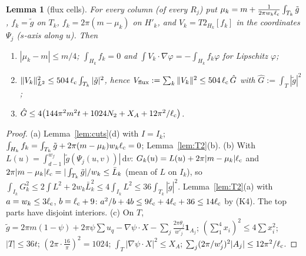 \documentclass[11pt]{article}
\newtheorem{lemma}[theorem]{Lemma}
\theoremstyle{definition}
\theoremstyle{remark}
\newcommand{\dd}{\,\mathrm d}
\newcommand{\lc}{\ell_{\rm c}}
\begin{document}
\begin{lemma}[flux cells]\label{lem:flux}
For every column (of every $R_j$) put $\mu_k=m+\frac1{2\pi w_k\lc}\int_{T_k}\tilde g$, $f_k=\tilde g$ on $T_k$, $f_k=2\pi(m-\mu_k)$ on $H'_k$, and
$V_k=T2_{H_k}[f_k]$ in the coordinates $\Psi_j$ ($s$-axis along $u$). Then
\begin{enumerate}[label=(\alph*)]
\item $|\mu_k-m|\le m/4$; $\int_{H_k}f_k=0$ and $\int V_k\cdot\nabla\varphi=-\int_{H_k}f_k\varphi$ for Lipschitz $\varphi$;
\item $\|V_k\|^2_{L^2}\le504\,\lc\int_{T_k}|\tilde g|^2$, hence $V_{\rm flux}:=\sum_k\|V_k\|^2\le504\,\lc\,\hat G$ with $\hat G:=\int_T|\tilde g|^2$;
\item $\hat G\le4\bigl(144\pi^2m^2t+1024N_2+X_A+12\pi^2/\lc\bigr)$.
\end{enumerate}
\end{lemma}
\begin{proof}
(a) Lemma~\ref{lem:cuts}(d) with $I=I_k$; $\int_{H_k}f_k=\int_{T_k}\tilde g+2\pi(m-\mu_k)w_k\lc=0$; Lemma~\ref{lem:T2}(b).
(b) With $L(u)=\int_{d-1}^{w_f}|\tilde g(\Psi_j(u,v))|\dd v$: $G_k(u)=L(u)+2\pi|m-\mu_k|\lc$ and $2\pi|m-\mu_k|\lc=|\int_{T_k}\tilde g|/w_k\le\bar L_k$ (mean of $L$ on
$I_k$), so $\int_{I_k}G_k^2\le2\int L^2+2w_k\bar L_k^2\le4\int_{I_k}L^2\le36\int_{T_k}|\tilde g|^2$. Lemma~\ref{lem:T2}(a) with $a=w_k\le3\lc$, $b=\lc+9$:
$a^2/b+4b\le9\lc+4\lc+36\le14\lc$ by (K4). The top parts have disjoint interiors.
(c) On $T$, $\tilde g=2\pi m(1-\psi)+2\pi\psi\sum u_q-\nabla\psi\cdot X-\sum_j\frac{2\pi\theta_j}{w'_j}\mathbf 1_{A_j}$; $(\sum_1^4x_i)^2\le4\sum x_i^2$; $|T|\le36t$;
$(2\pi\cdot\frac{16}\pi)^2=1024$; $\int_T|\nabla\psi\cdot X|^2\le X_A$; $\sum_j(2\pi/w'_j)^2|A_j|\le12\pi^2/\lc$.
\end{proof}
\end{document}
